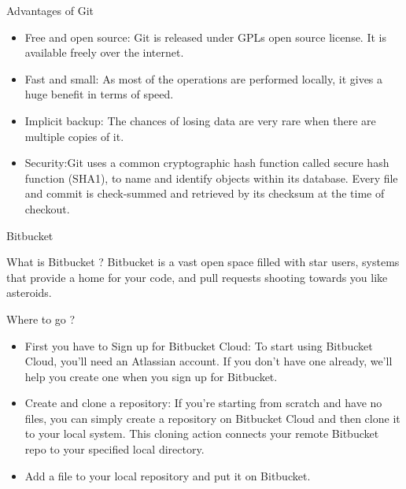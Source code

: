 \documentclass[pdf]{beamer}
\begin{document}
\begin{frame}
\begin{block}{Advantages of Git}
\begin{itemize}
\item Free and open source: Git is released under GPLs open source license. It is available freely over the internet.
\item Fast and small: As most of the operations are performed locally, it gives a
huge benefit in terms of speed.
\item Implicit backup: The chances of losing data are very rare when
there are multiple copies of it.
\item Security:Git uses a common cryptographic hash function called
secure hash function (SHA1), to name and identify objects within its database. Every file and commit is check-summed and retrieved by its checksum at the time of checkout.
\end{itemize}
\end{block}
\end{frame}

\begin{frame}{Bitbucket}
	\begin{block}{What is Bitbucket ?}
	Bitbucket is a vast open space filled with star users, systems that provide a home for your code, and pull requests shooting towards you like asteroids.
	\end{block}
\end{frame}

\begin{frame}
\begin{block}{Where to go ?}
\begin{itemize}
\item First you have to Sign up for Bitbucket Cloud: To start using Bitbucket Cloud, you’ll need an Atlassian account. If you don’t have one already, we’ll help you create one when you sign up for Bitbucket.
\item Create and clone a repository: If you’re starting from scratch and have no files, you can simply create a repository on Bitbucket Cloud and then clone it to your local system. This cloning action connects your remote Bitbucket repo to your specified local directory.
\item Add a file to your local repository and put it on Bitbucket.
\end{itemize}
\end{block}
\end{frame}
\end{document}
